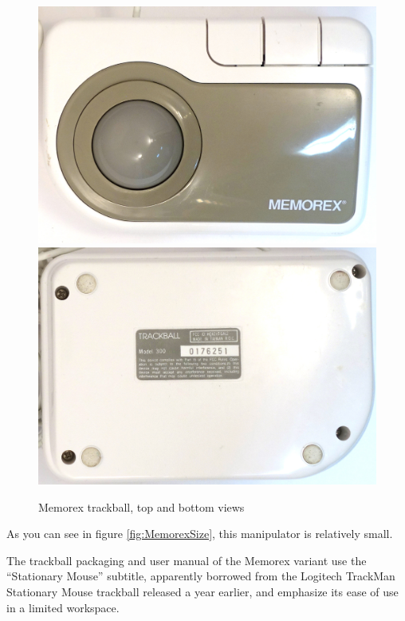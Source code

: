 \documentclass[11pt, a4paper]{article}
\begin{document}
\begin{figure}[h]
    \centering
    \includegraphics[scale=0.5]{1994_memorex_trackball/top_30.jpg}
    \includegraphics[scale=0.5]{1994_memorex_trackball/bottom_30.jpg}
    \caption{Memorex trackball, top and bottom views}
    \label{fig:MemorexTopBottom}
\end{figure}

As you can see in figure \ref{fig:MemorexSize}, this manipulator is relatively small.

The trackball packaging and user manual of the Memorex variant use the “Stationary Mouse” subtitle, apparently borrowed from the Logitech TrackMan Stationary Mouse trackball released a year earlier, and emphasize its ease of use in a limited workspace.
\end{document}
